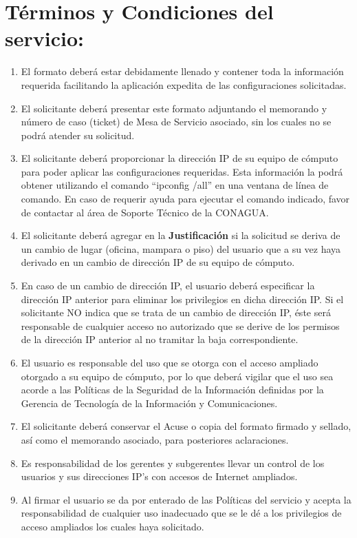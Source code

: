 \documentclass[letterpaper,9pt]{article}
\begin{document}
\clearpage
\section*{Términos y Condiciones del servicio:}
{\small \begin{enumerate}
	\item 	El formato deberá estar debidamente llenado y contener toda la información requerida facilitando la aplicación expedita de las configuraciones solicitadas.
	\item 	El solicitante deberá presentar este formato adjuntando el memorando y número de caso (ticket) de Mesa de Servicio asociado, sin los cuales no se podrá atender su solicitud.         
	\item  	El solicitante deberá proporcionar la dirección IP de su equipo de cómputo para poder aplicar las configuraciones requeridas. Esta información la podrá obtener utilizando el comando “ipconfig /all” en una ventana de línea de comando. En caso de requerir ayuda para ejecutar el comando indicado, favor de contactar al área de Soporte Técnico de la CONAGUA.
	\item 	El solicitante deberá agregar en la \textbf {Justificación} si la solicitud se deriva de un cambio de lugar (oficina, mampara o piso) del usuario que a su vez haya derivado en un cambio de dirección IP de su equipo de cómputo.
	\item  	En caso de un cambio de dirección IP, el usuario deberá especificar la dirección IP anterior para eliminar los privilegios en dicha dirección IP. Si el solicitante NO indica que se trata de un cambio de dirección IP, éste será responsable de cualquier acceso no autorizado que se derive de los permisos de la dirección IP anterior al no tramitar la baja correspondiente.
	\item 	El usuario es responsable del uso que se otorga con el acceso ampliado otorgado a su equipo de cómputo, por lo que deberá vigilar que el uso sea acorde a las Políticas de la Seguridad de la Información definidas por la Gerencia de Tecnología de la Información y Comunicaciones.
	\item 	El solicitante deberá conservar el Acuse o copia del formato firmado y sellado, así como el memorando asociado, para posteriores aclaraciones.
	\item  	Es responsabilidad de los gerentes y subgerentes llevar un control de los usuarios y sus direcciones IP’s con accesos de Internet ampliados.
	\item 	Al firmar el usuario se da por enterado de las Políticas del servicio y acepta la responsabilidad de cualquier uso inadecuado que se le dé a los privilegios de acceso ampliados los cuales haya solicitado.

\end{enumerate}}
\end{document}
